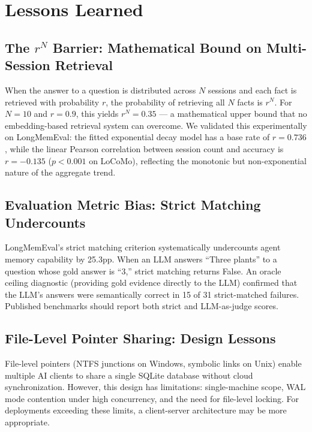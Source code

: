 \documentclass[11pt]{article}
\begin{document}
\section{Lessons Learned}
\label{sec:crosssys}

\subsection{The $r^N$ Barrier: Mathematical Bound on Multi-Session Retrieval}

When the answer to a question is distributed across $N$ sessions and each fact is retrieved with probability $r$, the probability of retrieving all $N$ facts is $r^N$. For $N=10$ and $r=0.9$, this yields $r^N = 0.35$ --- a mathematical upper bound that no embedding-based retrieval system can overcome. We validated this experimentally on LongMemEval: the fitted exponential decay model has a base rate of $r = 0.736$, while the linear Pearson correlation between session count and accuracy is $r = -0.135$ ($p < 0.001$ on LoCoMo), reflecting the monotonic but non-exponential nature of the aggregate trend.

\subsection{Evaluation Metric Bias: Strict Matching Undercounts}

LongMemEval's strict matching criterion systematically undercounts agent memory capability by 25.3pp. When an LLM answers ``Three plants'' to a question whose gold answer is ``3,'' strict matching returns False. An oracle ceiling diagnostic (providing gold evidence directly to the LLM) confirmed that the LLM's answers were semantically correct in 15 of 31 strict-matched failures. Published benchmarks should report both strict and LLM-as-judge scores.

\subsection{File-Level Pointer Sharing: Design Lessons}

File-level pointers (NTFS junctions on Windows, symbolic links on Unix) enable multiple AI clients to share a single SQLite database without cloud synchronization. However, this design has limitations: single-machine scope, WAL mode contention under high concurrency, and the need for file-level locking. For deployments exceeding these limits, a client-server architecture may be more appropriate.
\end{document}

